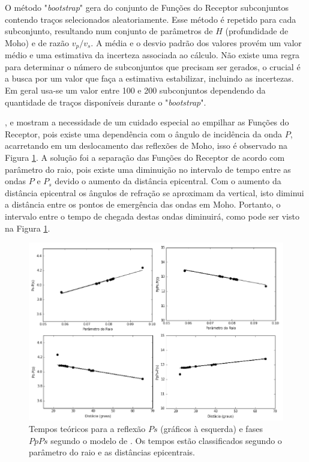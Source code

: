 O método "\textit{bootstrap}" gera do conjunto de Funções do Receptor subconjuntos contendo traços selecionados aleatoriamente. Esse método é repetido para cada subconjunto, resultando num conjunto de parâmetros de $H$ (profundidade de Moho) e de razão $v_{p}/v_{s}$. A média e o desvio padrão dos valores provém um valor médio e uma estimativa da incerteza associada ao cálculo. Não existe uma regra para determinar o número de subconjuntos que precisam ser gerados, o crucial é a busca por um valor que faça a estimativa estabilizar, incluindo as incertezas. Em geral usa-se um valor entre 100 e 200 subconjuntos dependendo da quantidade de traços disponíveis durante o "\textit{bootstrap}".

\cite{assumpcao_crustal_2002},\cite{sand_franca_crustal_2004} e \cite{julia_deep_2008} mostram a necessidade de um cuidado especial ao empilhar as Funções do Receptor, pois existe uma dependência com o ângulo de incidência da onda $P$, acarretando em um deslocamento das reflexões de Moho, isso é observado na Figura \ref{tauptime}. A solução foi a separação das Funções do Receptor de acordo com parâmetro do raio, pois existe uma diminuição no intervalo de tempo entre as ondas $P$ e $P_{s}$ devido o aumento da distância epicentral. Com o aumento da distância epicentral os ângulos de refração se aproximam da vertical, isto diminui a distância entre os pontos de emergência das ondas em Moho. Portanto, o intervalo entre o tempo de chegada destas ondas diminuirá, como pode ser visto na Figura \ref{tauptime}.

\begin{figure}[!ht]
\centering
\includegraphics[scale=0.7]{Figs/tempo_teorico_modelo_tauptime.png}
\caption[Tempos teóricos para a reflexão $Ps$ (gráficos à esquerda) e fases $PpPs$ segundo o modelo de \cite{kennet_iaspei_1991}.]{Tempos teóricos para a reflexão $Ps$ (gráficos à esquerda) e fases $PpPs$ segundo o modelo de \cite{kennet_iaspei_1991}. Os tempos estão classificados segundo o parâmetro do raio e as distâncias epicentrais.}
\label{tauptime}
\end{figure}


